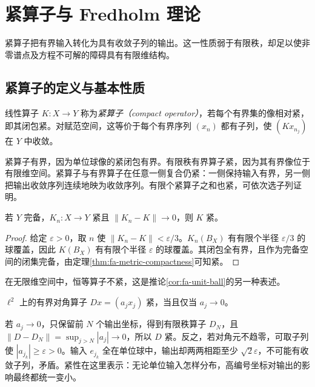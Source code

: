 \setcounter{chapter}{10} %
\chapter{紧算子与 Fredholm 理论}
\label{chap:fa-compact}

紧算子把有界输入转化为具有收敛子列的输出。这一性质弱于有限秩，却足以使非零谱点及方程不可解的障碍具有有限维结构。

\section{紧算子的定义与基本性质}
\begin{definition}
线性算子 $K:X\to Y$ 称为\emph{紧算子（compact operator）}，若每个有界集的像相对紧，即其闭包紧。对赋范空间，这等价于每个有界序列 $(x_n)$ 都有子列，使 $(Kx_{n_j})$ 在 $Y$ 中收敛。
\end{definition}
紧算子有界，因为单位球像的紧闭包有界。有限秩有界算子紧，因为其有界像位于有限维空间。紧算子与有界算子在任意一侧复合仍紧：一侧保持输入有界，另一侧把输出收敛序列连续地映为收敛序列。有限个紧算子之和也紧，可依次选子列证明。

\begin{proposition}\label{prop:fa-compact-closed}
若 $Y$ 完备，$K_n:X\to Y$ 紧且 $\|K_n-K\|\to0$，则 $K$ 紧。
\end{proposition}
\begin{proof}
给定 $\varepsilon>0$，取 $n$ 使 $\|K_n-K\|<\varepsilon/3$。$K_n(B_X)$ 有有限个半径 $\varepsilon/3$ 的球覆盖，因此 $K(B_X)$ 有有限个半径 $\varepsilon$ 的球覆盖。其闭包全有界，且作为完备空间的闭集完备，由定理\ref{thm:fa-metric-compactness}可知紧。
\end{proof}
在无限维空间中，恒等算子不紧，这是推论\ref{cor:fa-unit-ball}的另一种表述。

\begin{example}[尾部衰减怎样产生紧性]\label{ex:fa-diagonal-compactness}
$\ell^2$ 上的有界对角算子 $Dx=(a_jx_j)$ 紧，当且仅当 $a_j\to0$。
\end{example}
\begin{solve}
若 $a_j\to0$，只保留前 $N$ 个输出坐标，得到有限秩算子 $D_N$，且 $\|D-D_N\|=\sup_{j>N}|a_j|\to0$，所以 $D$ 紧。反之，若对角元不趋零，可取子列使 $|a_{j_k}|\geq\varepsilon>0$。输入 $e_{j_k}$ 全在单位球中，输出却两两相距至少 $\sqrt2\varepsilon$，不可能有收敛子列，矛盾。紧性在这里表示：无论单位输入怎样分布，高编号坐标对输出的影响最终都统一变小。
\end{solve}

